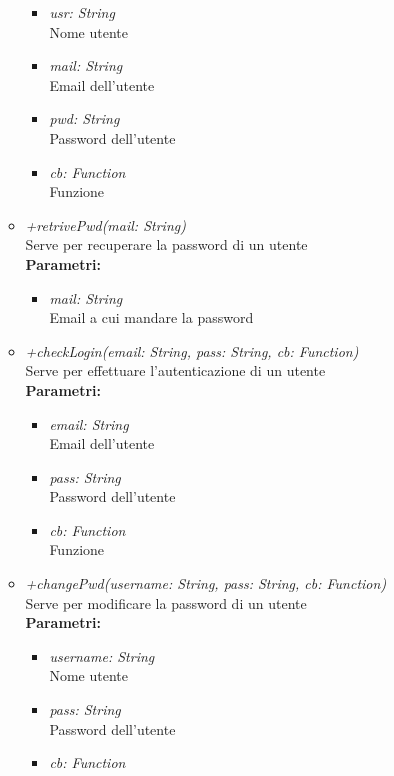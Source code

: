 \begin{itemize}
\begin{itemize}
\begin{itemize}
    			\item \emph{usr: String}\\
    			Nome utente
    			\item \emph{mail: String}\\
    			Email dell'utente
    			\item \emph{pwd: String}\\
    			Password dell'utente
    			\item \emph{cb: Function}\\
    			Funzione
    		\end{itemize}
    		\item \emph{+retrivePwd(mail: String)}\\
    		Serve per recuperare la password di un utente\\
    		\textbf{Parametri:}
    		\begin{itemize}
    			\item \emph{mail: String}\\
    			Email a cui mandare la password
    		\end{itemize}
    		\item \emph{+checkLogin(email: String, pass: String, cb: Function)}\\
    		Serve per effettuare l'autenticazione di un utente\\
    		\textbf{Parametri:}
    		\begin{itemize}
    			\item \emph{email: String}\\
    			Email dell'utente
    			\item \emph{pass: String}\\
    			Password dell'utente
    			\item \emph{cb: Function}\\
    			Funzione
    		\end{itemize}
    		\item \emph{+changePwd(username: String, pass: String, cb: Function)}\\
    		Serve per modificare la password di un utente\\
    		\textbf{Parametri:}
    		\begin{itemize}
    			\item \emph{username: String}\\
    			Nome utente
    			\item \emph{pass: String}\\
    			Password dell'utente
    			\item \emph{cb: Function}\\

\end{itemize}
\end{itemize}
\end{itemize}
